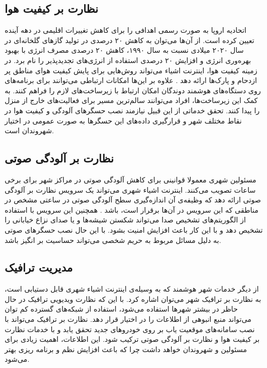     \subsection{نظارت بر کیفیت هوا}
      اتحادیه اروپا به صورت رسمی اهدافی را برای کاهش تغییرات اقلیمی در دهه آینده تعیین کرده است.
      از آن‌ها می‌توان به کاهش ۲۰ درصدی در تولید گاز‌های گلخانه‌ای در سال ۲۰۲۰ میلادی نسبت به سال ۱۹۹۰، کاهش ۲۰ درصدی مصرف انرژی با بهبود بهره‌وری انرژی و افزایش ۲۰ درصدی استفاده از انرژی‌های تجدید‌پذیر را نام برد.
      در زمینه کیفیت هوا، اینترنت اشیاء می‌تواند روش‌هایی برای پایش کیفیت هوای مناطق پر ازدحام و پارک‌ها ارائه دهد \cite{al2010mobile}.
      علاوه بر این‌ها امکانات ارتباطی می‌توانند برای برنامه‌های روی دستگاه‌های هوشمند دوندگان امکان ارتباط با زیرساخت‌های لازم را فراهم کنند.
      به کمک این زیرساخت‌ها، افراد می‌توانند سالم‌ترین مسیر برای فعالیت‌های خارج از منزل را پیدا کنند.
      تحقق خدماتی از این قبیل نیازمند نصب حسگر‌های آلودگی و کیفیت هوا در نقاط مختلف شهر و قرارگیری داده‌های این حسگر‌ها به صورت عمومی در اختیار شهروندان است.

    \subsection{نظارت بر آلودگی صوتی}
      مسئولین شهری معمولا قوانینی برای کاهش آلودگی صوتی در مراکز شهر برای برخی ساعات تصویب می‌کنند.
      اینترنت اشیاء شهری می‌تواند یک سرویس نظارت بر آلودگی صوتی ارائه دهد که وظیفه‌ی آن اندازه‌گیری سطح آلودگی صوتی در ساعتی مشخص در مناطقی که این سرویس در آن‌ها برقرار است، باشد \cite{maisonneuve2009citizen}.
      همچنین این سرویس با استفاده از الگوریتم‌های تشخیص صدا می‌تواند شکستن شیشه‌ها و یا صدای نزاع خیابانی را تشخیص دهد و با این کار باعث افزایش امنیت بشود.
      با این حال نصب حسگر‌های صوتی به دلیل مسائل مربوط به حریم شخصی می‌تواند حساسیت بر انگیز باشد.

    \subsection{مدیریت ترافیک}
      از دیگر خدمات شهر هوشمند که به وسیله‌ی اینترنت اشیاء شهری قابل دستیابی است، به نظارت بر ترافیک شهر می‌توان اشاره کرد.
      با این که نظارت ویدیویی ترافیک در حال حاظر در بیشتر شهر‌ها استفاده می‌شود، استفاده از شبکه‌های گسترده کم توان می‌تواند منبع انبوهی از اطلاعات را در اختیار قرار دهد.
      نظارت بر ترافیک می‌تواند با نصب سامانه‌های موقعیت یاب بر روی خودرو‌های جدید تحقق یابد \cite{li2008performance} و با خدمات نظارت بر کیفیت هوا و نظارت بر آلودگی صوتی ترکیب شود.
      این اطلاعات، اهمیت زیادی برای مسئولین و شهروندان خواهد داشت چرا که باعث افزایش نظم و برنامه ریزی بهتر می‌شود.

